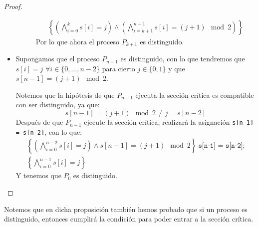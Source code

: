 \begin{ejercicio}
\begin{prop}
\begin{proof}
\begin{itemize}
\begin{description}
\begin{multline*}
                                \left\{\left(\bigwedge_{i=0}^{k}s[i] = j\right)\land\left(\bigwedge_{i=k+1}^{n-1}s[i] = (j+1)\mod 2\right)\right\}
                            \end{multline*}
                            Por lo que ahora el proceso $P_{k+1}$ es distinguido.
                    \end{description}
                \item Supongamos que el proceso $P_{n-1}$ es distinguido, con lo que tendremos que $s[i] = j$ $\forall i \in \{0,\ldots,n-2\}$ para cierto $j \in \{0,1\}$ y que \newline $s[n-1] = (j+1)\mod 2$. 

                    Notemos que la hipótesis de que $P_{n-1}$ ejecuta la sección crítica es compatible con ser distinguido, ya que:
                    \begin{equation*}
                        s[n-1] = (j+1)\mod 2 \neq j = s[n-2]
                    \end{equation*}
                    Después de que $P_{n-1}$ ejecute la sección crítica, realizará la asignación \newline \verb|s[n-1] = s[n-2]|, con lo que:
                    \begin{multline*}
                        \left\{\left(\bigwedge_{i=0}^{n-2}s[i] = j\right) \land s[n-1] = (j+1)\mod 2\right\}\ \texttt{s[n-1] = s[n-2];}\\ \left\{\bigwedge_{i=0}^{n-1} s[i] = j\right\}
                    \end{multline*}
                    Y tenemos que $P_0$ es distinguido.
            \end{itemize}
        \end{proof}
    \end{prop}

    Notemos que en dicha proposición también hemos probado que si un proceso es distinguido, entonces cumplirá la condición para poder entrar a la sección crítica.\\


\end{ejercicio}
